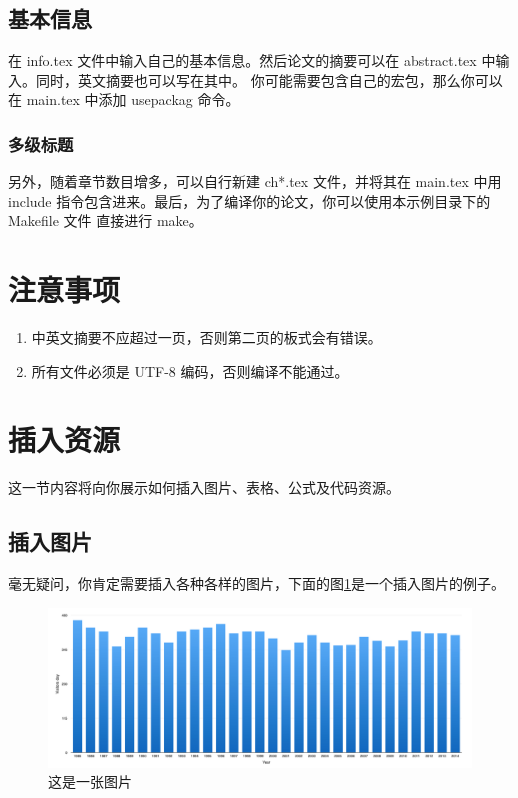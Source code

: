 \subsection{基本信息}
在 info.tex 文件中输入自己的基本信息。然后论文的摘要可以在 abstract.tex 中输入。同时，英文摘要也可以写在其中。
你可能需要包含自己的宏包，那么你可以在 main.tex 中添加 usepackag 命令。

\subsubsection{多级标题}
另外，随着章节数目增多，可以自行新建 ch*.tex 文件，并将其在 main.tex 中用 include 指令包含进来。最后，为了编译你的论文，你可以使用本示例目录下的 Makefile 文件 直接进行 make。

\section{注意事项}
\begin{enumerate}
\item 中英文摘要不应超过一页，否则第二页的板式会有错误。
\item 所有文件必须是 UTF-8 编码，否则编译不能通过。
\end{enumerate}

\section{插入资源}
这一节内容将向你展示如何插入图片、表格、公式及代码资源。
\subsection{插入图片}
毫无疑问，你肯定需要插入各种各样的图片，下面的图\ref{fig:one}是一个插入图片的例子。

\begin{figure}[htbp!]
\centering
\includegraphics[scale=0.3]{figures/pic.jpg}
\caption{这是一张图片}\label{fig:one}
\end{figure}

